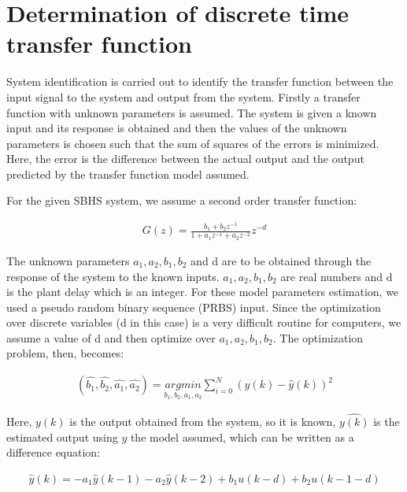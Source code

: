\section{Determination of discrete time transfer function}

System identification is carried out to identify the transfer function between the input signal to the system and output from the system. Firstly a transfer function with unknown parameters is assumed. The system is given a known input and its response is obtained and then the values of the unknown parameters is chosen such that the sum of squares of the errors is minimized. Here, the error is the difference between the actual output and the output predicted by the transfer function model assumed.



For the given SBHS system, we assume a second order transfer function:

\begin{align}\label{DTF}
G(z)=\frac{b_{1}+b_{2}z^{-1}}{1+a_{1}z^{-1}+a_{2}z^{-2}}z^{-d}
\end{align}


The unknown parameters $a_1, a_2, b_1, b_2$ and d are to be obtained through the response of the system to the known inputs.  $a_1, a_2, b_1, b_2$ are real numbers and d is the plant delay which is an integer.  For these model parameters estimation, we used a pseudo random binary sequence (PRBS) input. Since the optimization over discrete variables (d in this case) is a very difficult routine for computers, we assume a value of d and then optimize over  $a_1, a_2, b_1, b_2$. The optimization problem, then, becomes:


\begin{align}
(\hat{b_1}, \hat{b_2}, \hat{a_1}, \hat{a_2})=\underset{b_1, b_2, a_1, a_2}{argmin}\sum_{i=0}^{N}(y(k)-\hat{y}(k))^{2}
\end{align}


Here, $y(k)$ is the output obtained from the system, so it is known, $\hat{y(k)}$ is the estimated output using $y$ the model assumed, which can be written as a difference equation:

\begin{align}
\hat{y}(k) = -a_1\hat{y}(k - 1) - a_2\hat{y}(k - 2) + b_1 u(k - d) + b_2 u(k - 1 - d)
\end{align}

